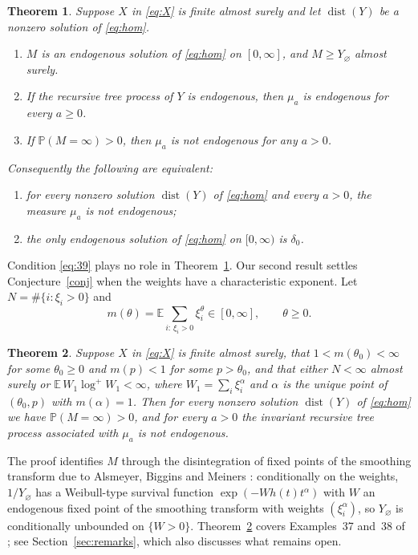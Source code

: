 \documentclass[11pt]{amsart}
\newtheorem{theorem}{Theorem}[section]
\theoremstyle{remark}
\newcommand{\Pb}{\mathbb{P}}
\newcommand{\E}{\mathbb{E}}
\newcommand{\dist}{\operatorname{dist}}
\begin{document}
\begin{theorem}\label{thm:main}
Suppose $X$ in \eqref{eq:X} is finite almost surely and let $\dist(Y)$ be a nonzero
solution of \eqref{eq:hom}.
\begin{enumerate}
\item[(a)] $M$ is an endogenous solution of \eqref{eq:hom} on $[0,\infty]$, and
$M\ge Y_\varnothing$ almost surely.
\item[(b)] If the recursive tree process of $Y$ is endogenous, then $\mu_a$ is endogenous
for every $a\ge0$.
\item[(c)] If $\Pb(M=\infty)>0$, then $\mu_a$ is not endogenous for any $a>0$.
\end{enumerate}
Consequently the following are equivalent:
\begin{enumerate}
\item[(i)] for every nonzero solution $\dist(Y)$ of \eqref{eq:hom} and every $a>0$, the
measure $\mu_a$ is not endogenous;
\item[(ii)] the only endogenous solution of \eqref{eq:hom} on $[0,\infty)$ is $\delta_0$.
\end{enumerate}
\end{theorem}

Condition \eqref{eq:39} plays no role in Theorem~\ref{thm:main}. Our second result settles
Conjecture~\ref{conj} when the weights have a characteristic exponent. Let
$N=\#\{i:\xi_i>0\}$ and
\[
m(\theta)=\E\sum_{i:\,\xi_i>0}\xi_i^{\theta}\in[0,\infty],\qquad \theta\ge0 .
\]

\begin{theorem}\label{thm:regular}
Suppose $X$ in \eqref{eq:X} is finite almost surely, that $1<m(\theta_0)<\infty$ for some
$\theta_0\ge 0$ and $m(p)<1$ for some $p>\theta_0$, and that either $N<\infty$ almost surely
or $\E\, W_1\log^+W_1<\infty$, where $W_1=\sum_i\xi_i^{\alpha}$ and $\alpha$ is the unique
point of $(\theta_0,p)$ with $m(\alpha)=1$. Then for every nonzero solution $\dist(Y)$ of
\eqref{eq:hom} we have $\Pb(M=\infty)>0$, and for every $a>0$ the invariant recursive tree
process associated with $\mu_a$ is not endogenous.
\end{theorem}

The proof identifies $M$ through the disintegration of fixed points of the smoothing
transform due to Alsmeyer, Biggins and Meiners \cite[Theorem~8.3]{ABM}: conditionally on
the weights, $1/Y_\varnothing$ has a Weibull-type survival function
$\exp(-Wh(t)t^{\alpha})$ with $W$ an endogenous fixed point of the smoothing transform with
weights $(\xi_i^{\alpha})$, so $Y_\varnothing$ is conditionally unbounded on $\{W>0\}$.
Theorem~\ref{thm:regular} covers Examples~37 and~38 of \cite{AB}; see
Section~\ref{sec:remarks}, which also discusses what remains open.
\end{document}

